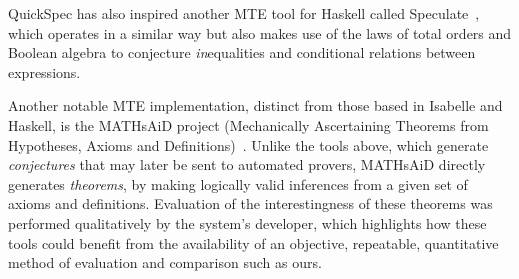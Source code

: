 QuickSpec has also inspired another MTE tool for Haskell called
Speculate~\cite{braquehais2017speculate}, which operates in a similar way but
also makes use of the laws of total orders and Boolean algebra to conjecture
\emph{in}equalities and conditional relations between expressions.

Another notable MTE implementation, distinct from those based in Isabelle and
Haskell, is the MATHsAiD project (Mechanically Ascertaining Theorems from
Hypotheses, Axioms and Definitions)~\cite{roy}. Unlike the tools above, which
generate \emph{conjectures} that may later be sent to automated provers,
MATHsAiD directly generates \emph{theorems}, by making logically valid
inferences from a given set of axioms and definitions. Evaluation of the
interestingness of these theorems was performed qualitatively by the system's
developer, which highlights how these tools could benefit from the availability
of an objective, repeatable, quantitative method of evaluation and comparison
such as ours.
